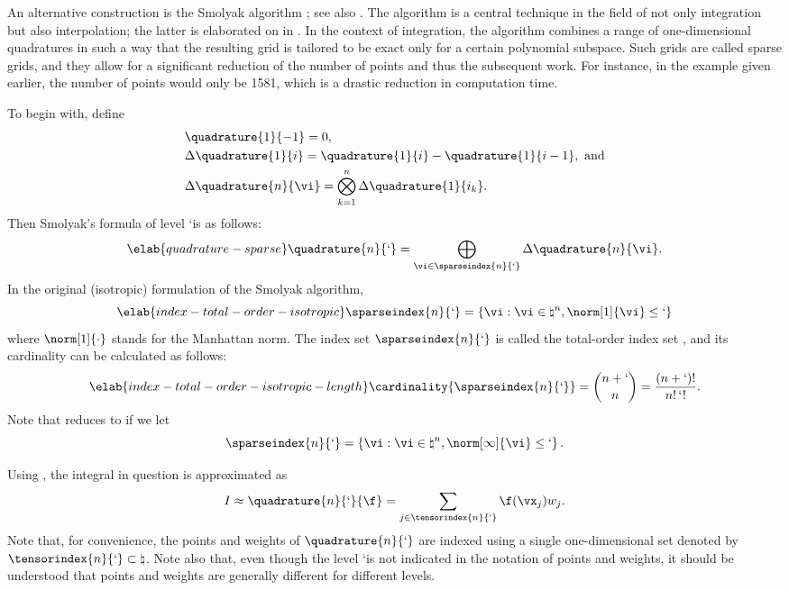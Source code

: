 An alternative construction is the Smolyak algorithm \cite{smolyak1963}; see
also \cite{klimke2006, eldred2008, heiss2008, maitre2010}. The algorithm is a
central technique in the field of not only integration but also interpolation;
the latter is elaborated on in . In the context of
integration, the algorithm combines a range of one-dimensional quadratures in
such a way that the resulting grid is tailored to be exact only for a certain
polynomial subspace. Such grids are called sparse grids, and they allow for a
significant reduction of the number of points and thus the subsequent work. For
instance, in the example given earlier, the number of points would only be 1581,
which is a drastic reduction in computation time.

To begin with, define
\begin{align*}
  & \quadrature{1}{-1} = 0, \\
  & \Delta\quadrature{1}{i} = \quadrature{1}{i} - \quadrature{1}{i - 1}, \text{ and} \\
  & \Delta\quadrature{n}{\vi} = \bigotimes_{k = 1}^n \Delta\quadrature{1}{i_k}.
\end{align*}
Then Smolyak's formula of level \lq is as follows:
\begin{equation} \elab{quadrature-sparse}
  \quadrature{n}{\lq} = \bigoplus_{\vi \in \sparseindex{n}{\lq}} \Delta\quadrature{n}{\vi}.
\end{equation}
In the original (isotropic) formulation of the Smolyak algorithm,
\begin{equation} \elab{index-total-order-isotropic}
  \sparseindex{n}{\lq} = \left\{ \vi: \vi \in \natural^n, \norm[1]{\vi} \leq \lq \right\}
\end{equation}
where $\norm[1]{\cdot}$ stands for the Manhattan norm. The index set
$\sparseindex{n}{\lq}$ is called the total-order index set \cite{eldred2008,
beck2011}, and its cardinality can be calculated as follows:
\begin{equation} \elab{index-total-order-isotropic-length}
  \cardinality{\sparseindex{n}{\lq}} = {n + \lq \choose n} = \frac{(n + \lq)!}{n! \, \lq!}.
\end{equation}
Note that  reduces to  if we let
\[
  \sparseindex{n}{\lq} = \left\{ \vi: \vi \in \natural^n, \norm[\infty]{\vi} \leq \lq \right\}.
\]

Using , the integral in question is approximated as
\[
  I \approx \quadrature{n}{\lq}{\f}
  = \sum_{j \in \tensorindex{n}{\lq}} \f(\vx_j) w_j.
\]
Note that, for convenience, the points and weights of $\quadrature{n}{\lq}$ are
indexed using a single one-dimensional set denoted by $\tensorindex{n}{\lq}
\subset \natural$. Note also that, even though the level \lq is not indicated in
the notation of points and weights, it should be understood that points and
weights are generally different for different levels.

